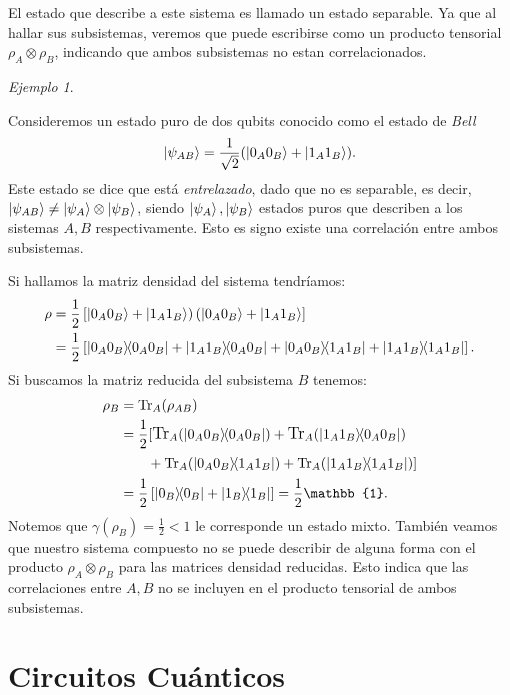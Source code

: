 \documentclass[letterpaper,12pt]{thesisECFM}
\theoremstyle{plain}
\theoremstyle{definition}
\theoremstyle{definition}
\theoremstyle{remark}
\newcommand{\1}{\mathbb{1}}
\newtheorem{ex}{Ejemplo}[section]
\begin{document}
El estado que describe a este sistema es llamado un estado separable. Ya que al hallar sus subsistemas, veremos que puede escribirse como un producto tensorial $\rho_A \otimes \rho_B$, indicando que ambos subsistemas no estan correlacionados.   

\begin{ex} \label{ex: traza parcial2} \end{ex} 
Consideremos un estado puro de dos qubits conocido como el estado de \textit{Bell} 
\begin{equation}
\label{ec:1.45}
    \ket{\psi_{AB}}=\frac{1}{\sqrt{2}} (\ket{0_A0_B} + \ket{1_A1_B}  ).
\end{equation}
Este estado se dice que está \textit{entrelazado}, dado que no es separable, es decir, $ \ket{\psi_{AB}} \neq \ket{\psi_A} \otimes \ket{\psi_B}$, siendo $\ket{\psi_A},\ket{\psi_B}$ estados puros que describen a los sistemas $A,B$ respectivamente. Esto es signo existe una correlación entre ambos subsistemas.

 Si hallamos la matriz densidad del sistema tendríamos:
\begin{align}
    \rho & =  \frac{1}{2}\left[ \ket{0_A0_B} + \ket{1_A1_B}        \right)\left( \ket{0_A0_B} + \ket{1_A1_B}        \right]\\
        & = \frac{1}{2} \left[ \ketbra{0_A0_B} + \ketbra{1_A1_B}{0_A0_B} + \ketbra{0_A0_B}{1_A1_B} + \ketbra{1_A1_B} \right].
\end{align}
Si buscamos la matriz reducida del subsistema $B$ tenemos:
\begin{align}
    \rho_B  & = \text{Tr}_A(\rho_{AB})\\
        & =  \frac{1}{2} \large[ \text{Tr}_A(\ketbra{0_A0_B}) + \text{Tr}_A(\ketbra{1_A1_B}{0_A0_B})\\
        & \qquad +\text{Tr}_A(\ketbra{0_A0_B}{1_A1_B}) + \text{Tr}_A(\ketbra{1_A1_B}{1_A1_B})  \large] \\
      & = \frac{1}{2} \left[ \ketbra{0_B} + \ketbra{1_B}  \right]  = \frac{1}{2} \mathbb{1}.
\end{align}
Notemos que $\gamma({\rho_B}) = \frac{1}{2} < 1$ le corresponde un estado mixto. También veamos que nuestro sistema compuesto no se puede describir de alguna forma con el producto $\rho_A \otimes \rho_B$ para las matrices densidad reducidas. Esto indica que las correlaciones entre $A,B$ no se incluyen en el producto tensorial de ambos subsistemas. 

\section{Circuitos Cuánticos} %
\end{document}
